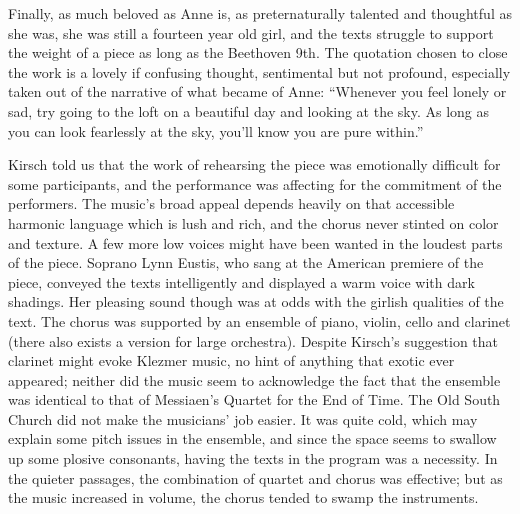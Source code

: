 Finally, as much beloved as Anne is, as preternaturally talented and thoughtful as she was, she was still a fourteen year old girl, and the texts struggle to support the weight of a piece as long as the Beethoven 9th. The quotation chosen to close the work is a lovely if confusing thought, sentimental but not profound, especially taken out of the narrative of what became of Anne: “Whenever you feel lonely or sad, try going to the loft on a beautiful day and looking at the sky. As long as you can look fearlessly at the sky, you’ll know you are pure within.”

Kirsch told us that the work of rehearsing the piece was emotionally difficult for some participants, and the performance was affecting for the commitment of the performers. The music’s broad appeal depends heavily on that accessible harmonic language which is lush and rich, and the chorus never stinted on color and texture. A few more low voices might have been wanted in the loudest parts of the piece. Soprano Lynn Eustis, who sang at the American premiere of the piece, conveyed the texts intelligently and displayed a warm voice with dark shadings. Her pleasing sound though was at odds with the girlish qualities of the text. The chorus was supported by an ensemble of piano, violin, cello and clarinet (there also exists a version for large orchestra). Despite Kirsch’s suggestion that clarinet might evoke Klezmer music, no hint of anything that exotic ever appeared; neither did the music seem to acknowledge the fact that the ensemble was identical to that of Messiaen’s Quartet for the End of Time. The Old South Church did not make the musicians’ job easier. It was quite cold, which may explain some pitch issues in the ensemble, and since the space seems to swallow up some plosive consonants, having the texts in the program was a necessity. In the quieter passages, the combination of quartet and chorus was effective; but as the music increased in volume, the chorus tended to swamp the instruments.

